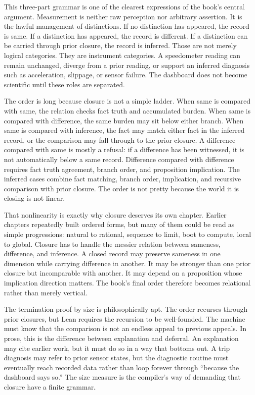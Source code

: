 This three-part grammar is one of the clearest expressions of the book's
central argument. Measurement is neither raw perception nor arbitrary
assertion. It is the lawful management of distinctions. If no distinction has
appeared, the record is same. If a distinction has appeared, the record is
different. If a distinction can be carried through prior closure, the record
is inferred. Those are not merely logical categories. They are instrument
categories. A speedometer reading can remain unchanged, diverge from a prior
reading, or support an inferred diagnosis such as acceleration, slippage, or
sensor failure. The dashboard does not become scientific until these roles are
separated.

The order  is long because closure is not a simple ladder.
When same is compared with same, the relation checks fact truth and accumulated
burden. When same is compared with difference, the same burden may sit below
either branch. When same is compared with inference, the fact may match either
fact in the inferred record, or the comparison may fall through to the prior
closure. A difference compared with same is mostly a refusal: if a difference
has been witnessed, it is not automatically below a same record. Difference
compared with difference requires fact truth agreement, branch order, and
proposition implication. The inferred cases combine fact matching, branch
order, implication, and recursive comparison with prior closure. The order is
not pretty because the world it is closing is not linear.

That nonlinearity is exactly why closure deserves its own chapter. Earlier
chapters repeatedly built ordered forms, but many of them could be read as
simple progressions: natural to rational, sequence to limit, boot to compute,
local to global. Closure has to handle the messier relation between sameness,
difference, and inference. A closed record may preserve sameness in one
dimension while carrying difference in another. It may be stronger than one
prior closure but incomparable with another. It may depend on a proposition
whose implication direction matters. The book's final order therefore becomes
relational rather than merely vertical.

The termination proof by size is philosophically apt. The order recurses
through prior closures, but Lean requires the recursion to be well-founded.
The machine must know that the comparison is not an endless appeal to previous
appeals. In prose, this is the difference between explanation and deferral.
An explanation may cite earlier work, but it must do so in a way that bottoms
out. A trip diagnosis may refer to prior sensor states, but the diagnostic
routine must eventually reach recorded data rather than loop forever through
``because the dashboard says so.'' The size measure is the compiler's way of
demanding that closure have a finite grammar.

